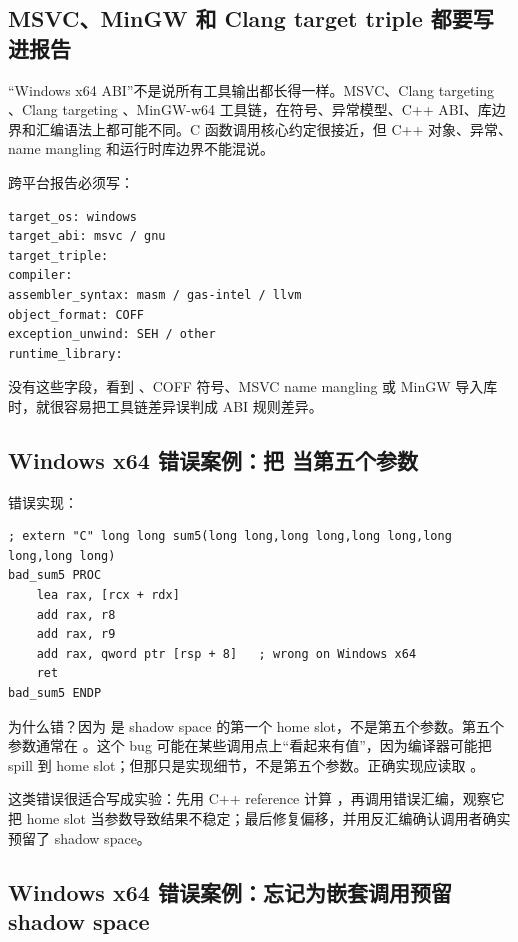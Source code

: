 \subsection{MSVC、MinGW 和 Clang target triple 都要写进报告}

“Windows x64 ABI”不是说所有工具输出都长得一样。MSVC、Clang targeting 、Clang targeting 、MinGW-w64 工具链，在符号、异常模型、C++ ABI、库边界和汇编语法上都可能不同。C 函数调用核心约定很接近，但 C++ 对象、异常、name mangling 和运行时库边界不能混说。

跨平台报告必须写：

\begin{lstlisting}[numbers=none,caption={Windows x64 目标身份字段}]
target_os: windows
target_abi: msvc / gnu
target_triple:
compiler:
assembler_syntax: masm / gas-intel / llvm
object_format: COFF
exception_unwind: SEH / other
runtime_library:
\end{lstlisting}

没有这些字段，看到 、COFF 符号、MSVC name mangling 或 MinGW 导入库时，就很容易把工具链差异误判成 ABI 规则差异。

\subsection{Windows x64 错误案例：把 \code{[rsp+8]} 当第五个参数}

错误实现：

\begin{lstlisting}[numbers=none,caption={错误：把 shadow slot 当第五个参数}]
; extern "C" long long sum5(long long,long long,long long,long long,long long)
bad_sum5 PROC
    lea rax, [rcx + rdx]
    add rax, r8
    add rax, r9
    add rax, qword ptr [rsp + 8]   ; wrong on Windows x64
    ret
bad_sum5 ENDP
\end{lstlisting}

为什么错？因为 \code{[rsp+8]} 是 shadow space 的第一个 home slot，不是第五个参数。第五个参数通常在 \code{[rsp+40]}。这个 bug 可能在某些调用点上“看起来有值”，因为编译器可能把  spill 到 home slot；但那只是实现细节，不是第五个参数。正确实现应读取 \code{[rsp+40]}。

这类错误很适合写成实验：先用 C++ reference 计算 ，再调用错误汇编，观察它把 home slot 当参数导致结果不稳定；最后修复偏移，并用反汇编确认调用者确实预留了 shadow space。

\subsection{Windows x64 错误案例：忘记为嵌套调用预留 shadow space}

